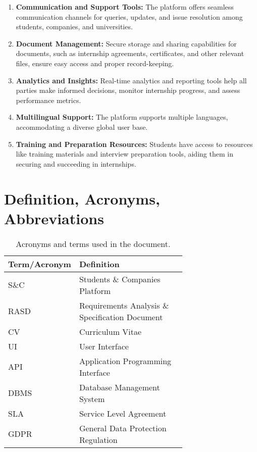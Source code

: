 \begin{enumerate}
\item \textbf{Communication and Support Tools:}
The platform offers seamless communication channels for queries, updates, and issue resolution among students, companies, and universities.
\item \textbf{Document Management:}
Secure storage and sharing capabilities for documents, such as internship agreements, certificates, and other relevant files, ensure easy access and proper record-keeping.

\item \textbf{Analytics and Insights:}
Real-time analytics and reporting tools help all parties make informed decisions, monitor internship progress, and assess performance metrics.

\item \textbf{Multilingual Support:}
The platform supports multiple languages, accommodating a diverse global user base.

\item \textbf{Training and Preparation Resources:}
Students have access to resources like training materials and interview preparation tools, aiding them in securing and succeeding in internships.
\end{enumerate}


\section{Definition, Acronyms, Abbreviations}
\label{sec:definition_acronyms_abbreviations}%
\begin{table}[H]
    \centering
    \begin{tabular}{ |l|p{0.7\linewidth}| }
        \hline
        \textbf{Term/Acronym} & \textbf{Definition} \\
        \hline
        S\&C  & Students \& Companies Platform \\
        \hline
        RASD  & Requirements Analysis \& Specification Document \\
        \hline
        CV    & Curriculum Vitae \\
        \hline
        UI    & User Interface \\
        \hline
        API   & Application Programming Interface \\
        \hline
        DBMS  & Database Management System \\
        \hline
        SLA   & Service Level Agreement \\
        \hline
        GDPR  & General Data Protection Regulation \\
        \hline
    \end{tabular}
    \caption{Acronyms and terms used in the document.}
    \label{tab:acronyms_sc}
\end{table}

